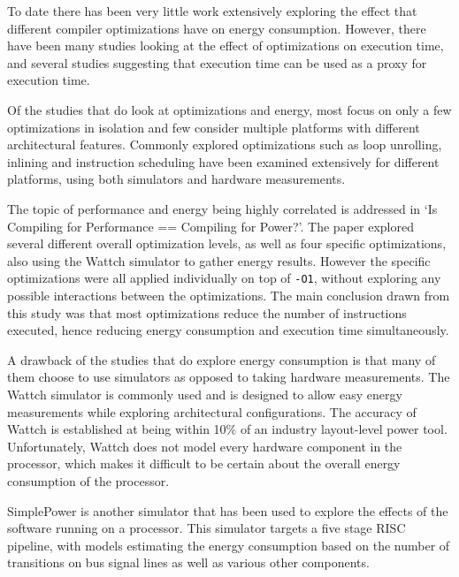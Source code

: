 \documentclass[twocolumn]{article}
\begin{document}
To date there has been very little work extensively exploring the effect that different compiler optimizations have on energy consumption. However, there have been many studies looking at the effect of optimizations on execution time\cite{Haneda2005}, and several studies suggesting that execution time can be used as a proxy for execution time\cite{CompilingForPerformancePower}.

Of the studies that do look at optimizations and energy, most focus on only a few optimizations in isolation and few consider multiple platforms with different architectural features. Commonly explored optimizations such as loop unrolling, inlining and instruction scheduling have been examined extensively for different platforms, using both simulators and hardware measurements\cite{EffectOfCompilerOptimizationsOnPentium4}.

The topic of performance and energy being highly correlated is addressed in `Is Compiling for Performance == Compiling for Power?'\cite{CompilingForPerformancePower}. The paper explored several different overall optimization levels, as well as four specific optimizations, also using the Wattch simulator to gather energy results. However the specific optimizations were all applied individually on top of \texttt{-O1}, without exploring any possible interactions between the optimizations. The main conclusion drawn from this study was that most optimizations reduce the number of instructions executed, hence reducing energy consumption and execution time simultaneously.

A drawback of the studies that do explore energy consumption is that many of them choose to use simulators as opposed to taking hardware measurements. The Wattch simulator\cite{Wattch} is commonly used and is designed to allow easy energy measurements while exploring architectural configurations. The accuracy of Wattch is established at being within 10\% of an industry layout-level power tool. Unfortunately, Wattch does not model every hardware component in the processor, which makes it difficult to be certain about the overall energy consumption of the processor.

SimplePower\cite{SimplePower} is another simulator that has been used to explore the effects of the software running on a processor. This simulator targets a five stage RISC pipeline, with models estimating the energy consumption based on the number of transitions on bus signal lines as well as various other components.
\end{document}
